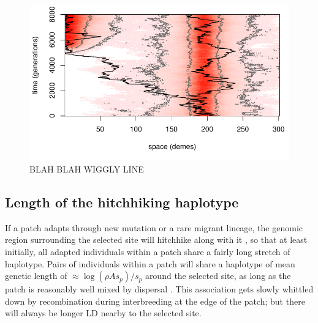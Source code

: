 \documentclass{article}
\begin{document}
\begin{figure}[ht]
  \begin{center}
    \includegraphics{sim-transit.pdf}
  \end{center}
  \caption{
  BLAH BLAH WIGGLY LINE
  \label{fig:lineagesmotion}
  }
\end{figure}




\subsection{Length of the hitchhiking haplotype}
\label{ss:haplotype_length}

If a patch adapts through new mutation or a rare migrant lineage, the
genomic region surrounding the selected site will hitchhike along with
it \citep{maynardsmith1974hitchhiking},
so that at least initially, all adapted individuals within a patch
share a fairly long stretch of haplotype. 
Pairs of individuals within a patch will share a haplotype of mean genetic length of
$\approx \log(\rho A s_p)/s_p$ around the selected site, 
as long as the patch is reasonably well mixed by dispersal
\citep[otherwise see][]{barton2013genetic}.
This association gets slowly whittled down by recombination during interbreeding at the edge of the patch;
but there will always be longer LD nearby to the selected site. 
\end{document}
